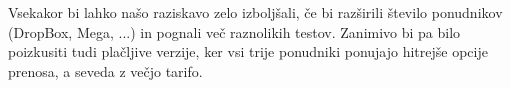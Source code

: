 \documentclass[11pt]{article}
\begin{document}
Vsekakor bi lahko našo raziskavo zelo izboljšali, če bi razširili število ponudnikov (DropBox, Mega, ...) in pognali več raznolikih testov. Zanimivo bi pa bilo poizkusiti tudi plačljive verzije, ker vsi trije ponudniki ponujajo hitrejše opcije prenosa, a seveda z večjo tarifo.





\end{document}
